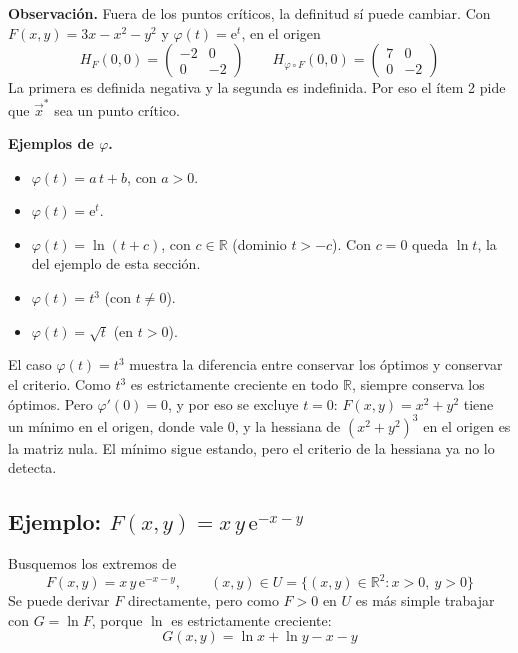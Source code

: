 \documentclass{article}
\newcommand{\R}{\ensuremath{\mathbb{R}}}
\newcommand{\vect}[1]{\vec{#1}}
\begin{document}
\medskip

\noindent\textbf{Observación.} Fuera de los puntos críticos, la definitud sí puede cambiar. Con \(F(x,y)=3x-x^2-y^2\) y \(\varphi(t)=\mathrm{e}^t\), en el origen
\[
H_F(0,0)=\begin{pmatrix}-2&0\\[4pt]0&-2\end{pmatrix}
\qquad
H_{\varphi\circ F}(0,0)=\begin{pmatrix}7&0\\[4pt]0&-2\end{pmatrix}
\]
La primera es definida negativa y la segunda es indefinida. Por eso el ítem 2 pide que \(\vect{x}^*\) sea un punto crítico.

\medskip


\noindent\textbf{Ejemplos de \(\varphi\).}
\begin{itemize}
  \item \(\varphi(t)=a\,t + b\), con \(a>0\).
  \item \(\varphi(t)=\mathrm{e}^t\).
  \item \(\varphi(t)=\ln(t + c)\), con \(c\in\R\) (dominio \(t>-c\)). Con \(c=0\) queda \(\ln t\), la del ejemplo de esta sección.
  \item \(\varphi(t)=t^3\) (con \(t\neq0\)).
  \item \(\varphi(t)=\sqrt{t}\) (en \(t>0\)).
\end{itemize}

\noindent El caso \(\varphi(t)=t^3\) muestra la diferencia entre conservar los óptimos y conservar el criterio. Como \(t^3\) es estrictamente creciente en todo \(\R\), siempre conserva los óptimos. Pero \(\varphi'(0)=0\), y por eso se excluye \(t=0\): \(F(x,y)=x^2+y^2\) tiene un mínimo en el origen, donde vale \(0\), y la hessiana de \((x^2+y^2)^3\) en el origen es la matriz nula. El mínimo sigue estando, pero el criterio de la hessiana ya no lo detecta.

\subsection*{Ejemplo: \(F(x,y)=x\,y\,\mathrm{e}^{-x-y}\)}

Busquemos los extremos de
\[
F(x,y)=x\,y\,\mathrm{e}^{-x-y},\qquad (x,y)\in U=\{(x,y)\in\R^2: x>0,\ y>0\}
\]
Se puede derivar \(F\) directamente, pero como \(F>0\) en \(U\) es más simple trabajar con \(G=\ln F\), porque \(\ln\) es estrictamente creciente:
\[
G(x,y)=\ln x+\ln y-x-y
\]

\medskip
\end{document}
